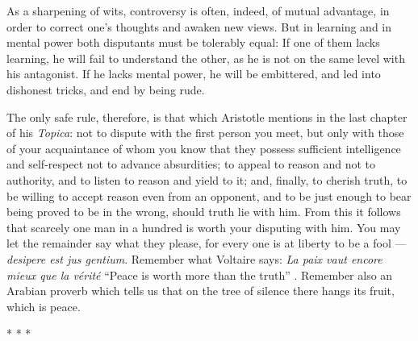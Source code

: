 \begin{quotationx}
As a sharpening of wits, controversy is often, indeed, of mutual advantage, in order to correct one's thoughts and awaken new views. But in learning and in mental power both disputants must be tolerably equal: If one of them lacks learning, he will fail to understand the other, as he is not on the same level with his antagonist. If he lacks mental power, he will be embittered, and led into dishonest tricks, and end by being rude.

The only safe rule, therefore, is that which Aristotle mentions in the last chapter of his \emph{Topica}: not to dispute with the first person you meet, but only with those of your acquaintance of whom you know that they possess sufficient intelligence and self-respect not to advance absurdities; to appeal to reason and not to authority, and to listen to reason and yield to it; and, finally, to cherish truth, to be willing to accept reason even from an opponent, and to be just enough to bear being proved to be in the wrong, should truth lie with him. From this it follows that scarcely one man in a hundred is worth your disputing with him. You may let the remainder say what they please, for every one is at liberty to be a fool --- \emph{desipere est jus gentium}. Remember what Voltaire says: \emph{La paix vaut encore mieux que la vérité} ``Peace is worth more than the truth'' . Remember also an Arabian proverb which tells us that on the tree of silence there hangs its fruit, which is peace.
\end{quotationx}




\begin{center}* * *\end{center}

